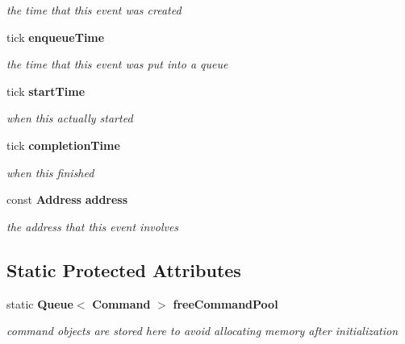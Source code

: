 \begin{CompactItemize}
\begin{CompactItemize}
\begin{CompactList}\small\item\em the time that this event was created \item\end{CompactList}\item 
tick {\bf enqueueTime}\label{class_d_r_a_msim_i_i_1_1_event_55cd17fa82ce4031824037df59dc50d3}

\begin{CompactList}\small\item\em the time that this event was put into a queue \item\end{CompactList}\item 
tick {\bf startTime}\label{class_d_r_a_msim_i_i_1_1_event_9f6b444813bf6568040678e0d8139d44}

\begin{CompactList}\small\item\em when this actually started \item\end{CompactList}\item 
tick {\bf completionTime}\label{class_d_r_a_msim_i_i_1_1_event_2a6e865d555bcde6264e8726edc95b38}

\begin{CompactList}\small\item\em when this finished \item\end{CompactList}\item 
const {\bf Address} {\bf address}\label{class_d_r_a_msim_i_i_1_1_event_6aa0830ccf3c9f103bc6dfaab1919562}

\begin{CompactList}\small\item\em the address that this event involves \item\end{CompactList}\end{CompactItemize}
\subsection*{Static Protected Attributes}
\begin{CompactItemize}
\item 
static {\bf Queue}$<$ {\bf Command} $>$ {\bf freeCommandPool}\label{class_d_r_a_msim_i_i_1_1_command_c78f5b2f70f8ab738d7e45d7474837ff}

\begin{CompactList}\small\item\em command objects are stored here to avoid allocating memory after initialization \item\end{CompactList}\end{CompactItemize}



\end{CompactItemize}

